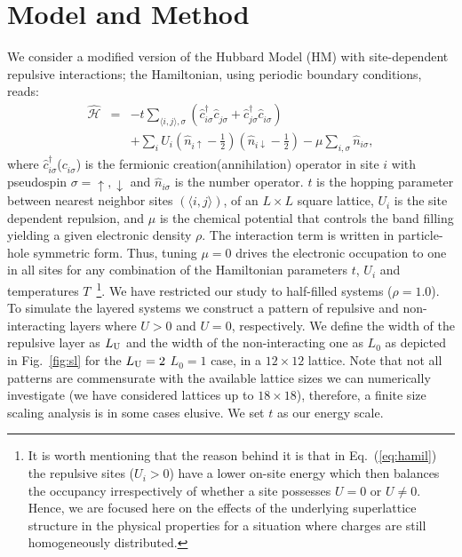 \documentclass[aps,pra,reprint,twocolumn,showpacs,longbibliography,superscriptaddress]{revtex4-1}
\begin{document}
\section{Model and Method}
\label{sec:M&M}
We consider a modified version of the Hubbard Model (HM) with site-dependent repulsive interactions; the Hamiltonian, using periodic boundary conditions, reads:
\begin{eqnarray}
\mathcal{\hat H} &=& - t \sum_{\langle i,j\rangle,\sigma}
(\hat c^\dagger_{i\sigma} \hat c_{j \sigma}^{\phantom\dagger} +
\hat c^\dagger_{j\sigma} \hat c_{i \sigma}^{\phantom\dagger} )
\nonumber
\\
&&+ \sum_i U_i\left(\hat n_{i\uparrow}-\frac{1}{2}\right)\left(\hat n_{i\downarrow}-\frac{1}{2}\right)
-\mu \sum_{i,\sigma} \hat n_{i\sigma},
\label{eq:hamil}
\end{eqnarray}
where $\hat c^\dagger_{i\sigma}$($c_{i \sigma}^{\phantom\dagger}$) is the fermionic creation(annihilation) operator in site $i$ with pseudospin $\sigma=\uparrow,\downarrow$ and $\hat n_{i\sigma}$ is the number operator. $t$ is the hopping parameter between nearest neighbor sites $(\langle i,j\rangle)$, of an $L\times L$ square lattice, $U_i$ is the site dependent repulsion, and $\mu$ is the chemical potential that controls the band filling yielding a given electronic density $\rho$. The interaction term is written in particle-hole symmetric form. Thus, tuning $\mu=0$ drives the electronic occupation to one in all sites for any combination of the Hamiltonian parameters $t$, $U_i$ and temperatures $T$~\footnote{It is worth mentioning that the reason behind it is that in Eq.~(\ref{eq:hamil}) the repulsive sites ($U_i>0$) have a lower on-site energy which then balances the occupancy irrespectively of whether a site possesses $U=0$ or $U\neq0$. Hence, we are focused here on the effects of the underlying superlattice structure in the physical properties for a situation where charges are still homogeneously distributed.}. We have restricted our study to half-filled systems ($\rho=1.0$). To simulate the layered systems we construct a pattern of repulsive and non-interacting layers where $U>0$  and $U=0$, respectively. We define the width of the repulsive layer as $L_{\rm U}$ and the width of the non-interacting one as $L_0$ as depicted in Fig.~\ref{fig:sl} for the  $L_{\rm U}=2$ $L_0=1$ case, in a $12\times12$ lattice. Note that not all patterns are commensurate with the available lattice sizes we can numerically investigate (we have considered lattices up to $18 \times 18$), therefore, a finite size scaling analysis is in some cases elusive. We set $t$ as our energy scale.
\end{document}
